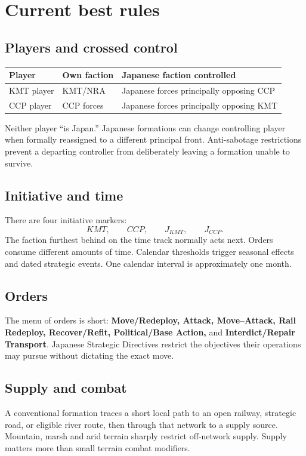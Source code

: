 \documentclass[11pt]{article}
\begin{document}
\section{Current best rules}

\subsection{Players and crossed control}
\begin{center}
\begin{tabular}{lll}
\toprule Player & Own faction & Japanese faction controlled \\\midrule
KMT player & KMT/NRA & Japanese forces principally opposing CCP \\
CCP player & CCP forces & Japanese forces principally opposing KMT \\
\bottomrule
\end{tabular}
\end{center}
Neither player ``is Japan.'' Japanese formations can change controlling player when formally reassigned to a different principal front. Anti-sabotage restrictions prevent a departing controller from deliberately leaving a formation unable to survive.

\subsection{Initiative and time}
There are four initiative markers:
\[
KMT,\qquad CCP,\qquad J_{KMT},\qquad J_{CCP}.
\]
The faction furthest behind on the time track normally acts next. Orders consume different amounts of time. Calendar thresholds trigger seasonal effects and dated strategic events. One calendar interval is approximately one month.

\subsection{Orders}
The menu of orders is short: \textbf{Move/Redeploy, Attack, Move--Attack, Rail Redeploy, Recover/Refit, Political/Base Action,} and \textbf{Interdict/Repair Transport}. Japanese Strategic Directives restrict the objectives their operations may pursue without dictating the exact move.

\subsection{Supply and combat}
A conventional formation traces a short local path to an open railway, strategic road, or eligible river route, then through that network to a supply source. Mountain, marsh and arid terrain sharply restrict off-network supply. Supply matters more than small terrain combat modifiers.
\end{document}
